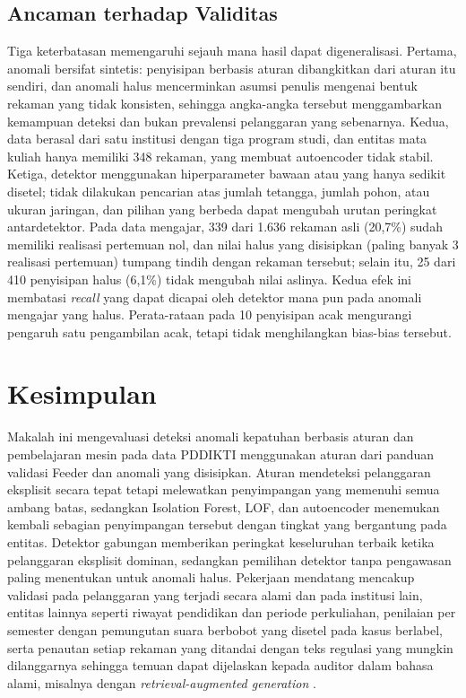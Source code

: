 \documentclass[conference]{IEEEtran}
\begin{document}
\subsection{Ancaman terhadap Validitas}
Tiga keterbatasan memengaruhi sejauh mana hasil dapat digeneralisasi. Pertama, anomali bersifat sintetis: penyisipan berbasis aturan dibangkitkan dari aturan itu sendiri, dan anomali halus mencerminkan asumsi penulis mengenai bentuk rekaman yang tidak konsisten, sehingga angka-angka tersebut menggambarkan kemampuan deteksi dan bukan prevalensi pelanggaran yang sebenarnya. Kedua, data berasal dari satu institusi dengan tiga program studi, dan entitas mata kuliah hanya memiliki 348 rekaman, yang membuat autoencoder tidak stabil. Ketiga, detektor menggunakan hiperparameter bawaan atau yang hanya sedikit disetel; tidak dilakukan pencarian atas jumlah tetangga, jumlah pohon, atau ukuran jaringan, dan pilihan yang berbeda dapat mengubah urutan peringkat antardetektor. Pada data mengajar, 339 dari 1.636 rekaman asli (20,7\%) sudah memiliki realisasi pertemuan nol, dan nilai halus yang disisipkan (paling banyak 3 realisasi pertemuan) tumpang tindih dengan rekaman tersebut; selain itu, 25 dari 410 penyisipan halus (6,1\%) tidak mengubah nilai aslinya. Kedua efek ini membatasi \textit{recall} yang dapat dicapai oleh detektor mana pun pada anomali mengajar yang halus. Perata-rataan pada 10 penyisipan acak mengurangi pengaruh satu pengambilan acak, tetapi tidak menghilangkan bias-bias tersebut.

\section{Kesimpulan}
Makalah ini mengevaluasi deteksi anomali kepatuhan berbasis aturan dan pembelajaran mesin pada data PDDIKTI menggunakan aturan dari panduan validasi Feeder dan anomali yang disisipkan. Aturan mendeteksi pelanggaran eksplisit secara tepat tetapi melewatkan penyimpangan yang memenuhi semua ambang batas, sedangkan Isolation Forest, LOF, dan autoencoder menemukan kembali sebagian penyimpangan tersebut dengan tingkat yang bergantung pada entitas. Detektor gabungan memberikan peringkat keseluruhan terbaik ketika pelanggaran eksplisit dominan, sedangkan pemilihan detektor tanpa pengawasan paling menentukan untuk anomali halus. Pekerjaan mendatang mencakup validasi pada pelanggaran yang terjadi secara alami dan pada institusi lain, entitas lainnya seperti riwayat pendidikan dan periode perkuliahan, penilaian per semester dengan pemungutan suara berbobot yang disetel pada kasus berlabel, serta penautan setiap rekaman yang ditandai dengan teks regulasi yang mungkin dilanggarnya sehingga temuan dapat dijelaskan kepada auditor dalam bahasa alami, misalnya dengan \textit{retrieval-augmented generation} \cite{gao2023rag}.
\end{document}
